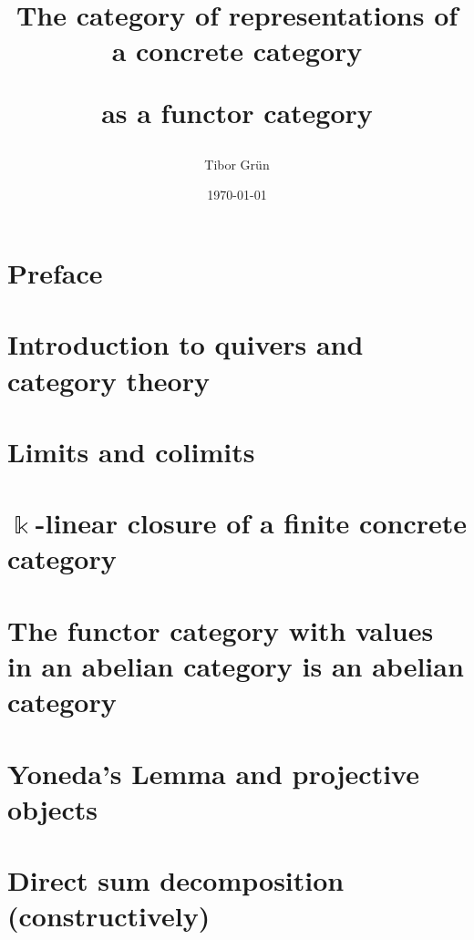 \documentclass[a4paper,12pt]{article}
\title{The category of representations of a concrete category\par as a functor category}
\author{Tibor Gr{\"u}n}
\date{\today}
\begin{document}

	

	\newpage

	\tableofcontents\label{toc}
	
	\newpage

	
\section*{Preface}

\newpage
{}
\phantom{}%
\newpage
{}
\section{Introduction to quivers and category theory}


\newpage
\section{Limits and colimits}


\newpage
\section{$\Bbbk$-linear closure of a finite concrete category}


\newpage
\section{The functor category with values in an abelian category is an abelian category}


\newpage
\section{Yoneda's Lemma and projective objects}


\newpage
\section{Direct sum decomposition (constructively)}

\end{document}
